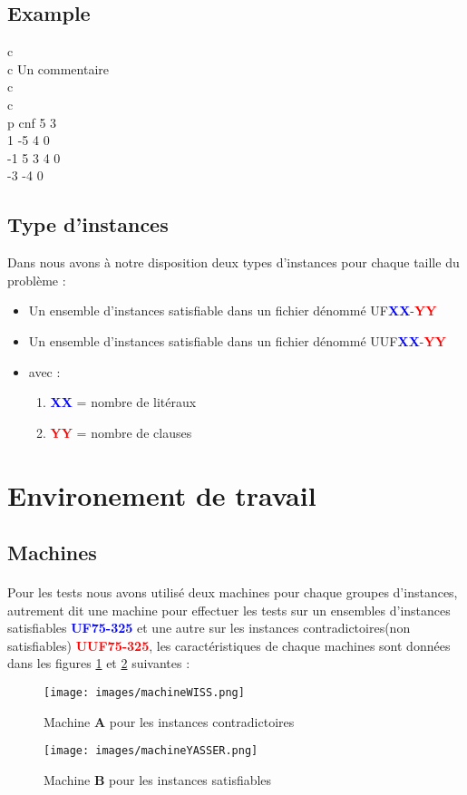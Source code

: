 \subsection{Example}
c\\
c Un commentaire\\
c\\
c \\
p cnf 5 3\\
1 -5 4 0\\
-1 5 3 4 0\\
-3 -4 0\\
\subsection{Type d'instances}
Dans \cite{Benchmark} nous avons à notre disposition deux types d'instances pour chaque taille du problème : \\
\begin{itemize}
	\item Un ensemble d'instances satisfiable dans un fichier dénommé UF\textbf{\textcolor{blue}{XX}}-\textbf{\textcolor{red}{YY}}
	\item Un ensemble d'instances satisfiable dans un fichier dénommé UUF\textbf{\textcolor{blue}{XX}}-\textbf{\textcolor{red}{YY}}
	\item avec : 
	\begin{enumerate}
		\item \textbf{\textcolor{blue}{XX}} = nombre de litéraux
		\item \textbf{\textcolor{red}{YY}} = nombre de clauses
	\end{enumerate}
\end{itemize}
\newpage
\section{Environement de travail}
\subsection{Machines}
\paragraph{}
Pour les tests nous avons utilisé deux machines pour chaque groupes d'instances, autrement dit une machine pour effectuer les tests sur un ensembles d'instances satisfiables \textbf{\textcolor{blue}{UF75-325}}\cite{Benchmark} et une autre sur les instances contradictoires(non satisfiables) \textbf{\textcolor{red}{UUF75-325}}\cite{Benchmark}, les caractéristiques de chaque machines sont données dans les figures \ref{fig:machineA} et \ref{fig:machineB} suivantes : 
\begin{figure}[H]
	\centering
	\texttt{[image: images/machineWISS.png]}
	\caption{Machine \textbf{A} pour les instances contradictoires}
	\label{fig:machineA}
\end{figure}
\begin{figure}[H]
	\centering
	\texttt{[image: images/machineYASSER.png]}
	\caption{Machine \textbf{B} pour les instances satisfiables}
	\label{fig:machineB}
\end{figure}
\newpage

